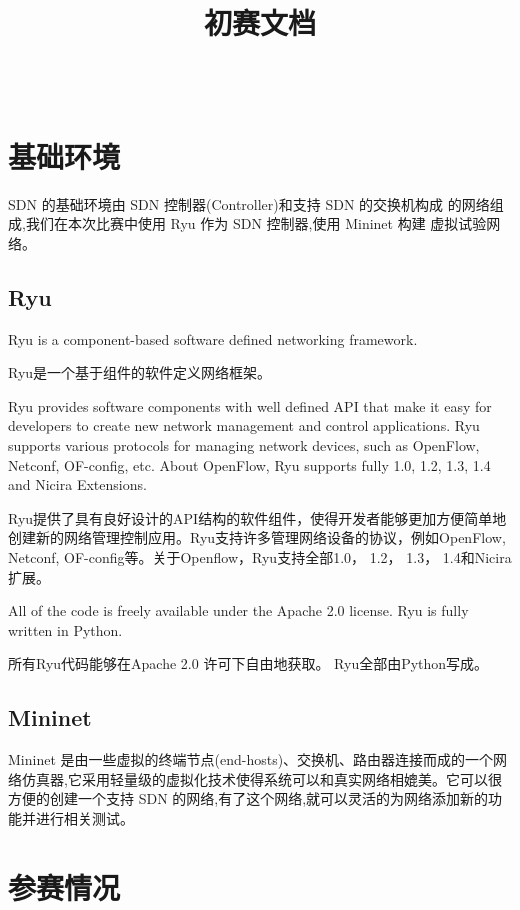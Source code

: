 \documentclass[format=draft,language=chinese,category=SDN]{hustreport}
\title{初赛文档}
\author{\kai{林家军}~~\kai{李英儒}~~\kai{胡云锐}}
\begin{document}
\nocite{*}

\frontmatter
\maketitle
\makeabstract
\tableofcontents
\listoffigures
\listoftables
\mainmatter

\chapter{基础环境}\label{chapter:BaiscEnv}
SDN 的基础环境由 SDN 控制器(Controller)和支持 SDN 的交换机构成
的网络组成,我们在本次比赛中使用 Ryu 作为 SDN 控制器,使用 Mininet 构建
虚拟试验网络。
\section{Ryu}
Ryu is a component-based software defined networking framework.

Ryu是一个基于组件的软件定义网络框架。

Ryu provides software components with well defined API that make it easy for developers to create new network management and control applications. Ryu supports various protocols for managing network devices, such as OpenFlow, Netconf, OF-config, etc. About OpenFlow, Ryu supports fully 1.0, 1.2, 1.3, 1.4 and Nicira Extensions.

Ryu提供了具有良好设计的API结构的软件组件，使得开发者能够更加方便简单地创建新的网络管理控制应用。Ryu支持许多管理网络设备的协议，例如OpenFlow, Netconf, OF-config等。关于Openflow，Ryu支持全部1.0， 1.2， 1.3， 1.4和Nicira扩展。

All of the code is freely available under the Apache 2.0 license. Ryu is fully written in Python.

所有Ryu代码能够在Apache 2.0 许可下自由地获取。 Ryu全部由Python写成。

\section{Mininet}
Mininet 是由一些虚拟的终端节点(end-hosts)、交换机、路由器连接而成的一个网络仿真器,它采用轻量级的虚拟化技术使得系统可以和真实网络相媲美。它可以很方便的创建一个支持 SDN 的网络,有了这个网络,就可以灵活的为网络添加新的功能并进行相关测试。

\chapter{参赛情况}\label{chapter:Situation}
\end{document}
